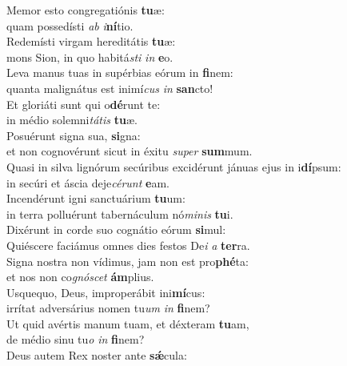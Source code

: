 \evenverse Memor esto congregatiónis \textbf{tu}æ:~\*\\
\evenverse quam possedísti \textit{ab} \textit{i}\textbf{ní}tio.\\
\oddverse Redemísti virgam hereditátis \textbf{tu}æ:~\*\\
\oddverse mons Sion, in quo habitá\textit{sti} \textit{in} \textbf{e}o.\\
\evenverse Leva manus tuas in supérbias eórum in \textbf{fi}nem:~\*\\
\evenverse quanta malignátus est inimí\textit{cus} \textit{in} \textbf{san}cto!\\
\oddverse Et gloriáti sunt qui o\textbf{dé}runt te:~\*\\
\oddverse in médio solemni\textit{tá}\textit{tis} \textbf{tu}æ.\\
\evenverse Posuérunt signa sua, \textbf{si}gna:~\*\\
\evenverse et non cognovérunt sicut in éxitu \textit{su}\textit{per} \textbf{sum}mum.\\
\oddverse Quasi in silva lignórum secúribus excidérunt jánuas ejus in i\textbf{dí}psum:~\*\\
\oddverse in secúri et áscia deje\textit{cé}\textit{runt} \textbf{e}am.\\
\evenverse Incendérunt igni sanctuárium \textbf{tu}um:~\*\\
\evenverse in terra polluérunt tabernáculum nó\textit{mi}\textit{nis} \textbf{tu}i.\\
\oddverse Dixérunt in corde suo cognátio eórum \textbf{si}mul:~\*\\
\oddverse Quiéscere faciámus omnes dies festos De\textit{i} \textit{a} \textbf{ter}ra.\\
\evenverse Signa nostra non vídimus, jam non est pro\textbf{phé}ta:~\*\\
\evenverse et nos non co\textit{gnó}\textit{scet} \textbf{ám}plius.\\
\oddverse Usquequo, Deus, improperábit ini\textbf{mí}cus:~\*\\
\oddverse irrítat adversárius nomen tu\textit{um} \textit{in} \textbf{fi}nem?\\
\evenverse Ut quid avértis manum tuam, et déxteram \textbf{tu}am,~\*\\
\evenverse de médio sinu tu\textit{o} \textit{in} \textbf{fi}nem?\\
\oddverse Deus autem Rex noster ante \textbf{sǽ}cula:~\*\\

